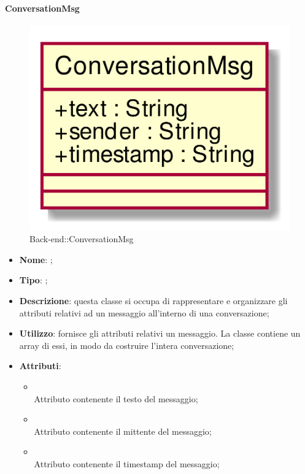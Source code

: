 \hypertarget{ConversationMsg_label}{\paragraph{ConversationMsg}}
\begin{figure}[h]
	\centering
	\includegraphics[width=\textwidth,height=\textheight,keepaspectratio]{images/ClassConversationMsg.png}
	\caption{Back-end::ConversationMsg}
\end{figure}
\begin{itemize}
	\item \textbf{Nome}: ;
	\item \textbf{Tipo}: ;
	\item \textbf{Descrizione}: questa classe si occupa di rappresentare e organizzare gli attributi relativi ad un messaggio all'interno di una conversazione;
	\item \textbf{Utilizzo}: fornisce gli attributi relativi un messaggio. La classe  contiene un array di essi, in modo da costruire l'intera conversazione;
	\item \textbf{Attributi}:
	\begin{itemize}
		\item[]  \\
		Attributo contenente il testo del messaggio;
		\item[]  \\
		Attributo contenente il mittente del messaggio;
		\item[]  \\
		Attributo contenente il timestamp del messaggio;
	\end{itemize}
\end{itemize}
\FloatBarrier

